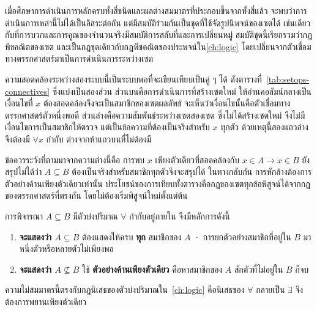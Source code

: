 เมื่อศึกษาการดำเนินการหลักครบทั้งสี่ชนิดและผลต่างสมมาตรที่ประกอบขึ้นจากทั้งสี่แล้ว จะพบว่าการดำเนินการเหล่านี้ไม่ได้เป็นอิสระต่อกัน แต่มีสมบัติร่วมกันเป็นชุดที่ใช้จัดรูปนิพจน์ของเซตได้ เช่นเดียวกับที่การบวกและการคูณของจำนวนจริงมีสมบัติการสลับที่และการเปลี่ยนหมู่ สมบัติชุดนี้เรียกรวมว่ากฎพีชคณิตของเซต และเป็นกฎชุดเดียวกับกฎพีชคณิตของประพจน์ใน\autoref{ch:logic} โดยเปลี่ยนจากตัวเชื่อมทางตรรกศาสตร์มาเป็นการดำเนินการระหว่างเซต

ความสอดคล้องระหว่างสองระบบนี้เป็นระบบพอที่จะเขียนเทียบเป็นคู่ ๆ ได้ ดังตารางที่~\ref{tab:setops-connectives} ซึ่งแบ่งเป็นสองส่วน ส่วนบนคือการดำเนินการที่สร้างเซตใหม่ ให้อ่านคอลัมน์กลางเป็นเงื่อนไขที่ $x$ ต้องสอดคล้องจึงจะเป็นสมาชิกของเซตผลลัพธ์ จะเห็นว่าเงื่อนไขนั้นคือตัวเชื่อมทางตรรกศาสตร์ตัวหนึ่งพอดี ส่วนล่างคือความสัมพันธ์ระหว่างเซตสองเซต ซึ่งไม่ได้สร้างเซตใหม่ จึงไม่มีเงื่อนไขการเป็นสมาชิกให้ตรวจ แต่เป็นข้อความที่ต้องเป็นจริงสำหรับ $x$ ทุกตัว ด้วยเหตุนี้สองแถวล่างจึงต้องมี $\forall x$ กำกับ ต่างจากห้าแถวบนที่ไม่ต้องมี

ข้อควรระวังที่ตามมาจากความต่างนี้คือ การพบ $x$ เพียงตัวเดียวที่สอดคล้องกับ $x \in A \rightarrow x \in B$ ยังสรุปไม่ได้ว่า $A \subseteq B$ ต้องเป็นจริงสำหรับสมาชิกทุกตัวจึงจะสรุปได้ ในทางกลับกัน การหักล้างต้องการตัวอย่างค้านเพียงตัวเดียวเท่านั้น ประโยชน์ของการเทียบทั้งตารางคือกฎของเซตทุกข้อพิสูจน์ได้จากกฎของตรรกศาสตร์ที่ตรงกัน โดยไม่ต้องเริ่มพิสูจน์ใหม่ตั้งแต่ต้น

\begin{warning}
การพิจารณา $A \subseteq B$ มีตัวบ่งปริมาณ $\forall$ กำกับอยู่ภายใน จึงมีหลักการดังนี้

\begin{enumerate}
    \item \textbf{จะแสดงว่า $A \subseteq B$} ต้องแสดงให้ครบ \textbf{ทุก} สมาชิกของ $A$ · การยกตัวอย่างสมาชิกที่อยู่ใน $B$ มาหนึ่งตัวหรือหลายตัวไม่เพียงพอ
    \item \textbf{จะแสดงว่า $A \not\subseteq B$} ใช้ \textbf{ตัวอย่างค้านเพียงตัวเดียว} คือหาสมาชิกของ $A$ สักตัวที่ไม่อยู่ใน $B$ ก็จบ
\end{enumerate}

ความไม่สมมาตรนี้ตรงกับกฎนิเสธของตัวบ่งปริมาณใน~\autoref{ch:logic} คือนิเสธของ $\forall$ กลายเป็น $\exists$ จึงต้องการพยานเพียงตัวเดียว
\end{warning}

